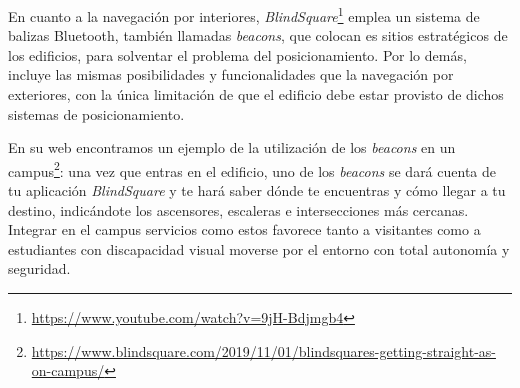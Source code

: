 En cuanto a la navegación por interiores, \textit{BlindSquare}\footnote{\url{https://www.youtube.com/watch?v=9jH-Bdjmgb4}} emplea un sistema de balizas Bluetooth, también llamadas \textit{beacons}, que colocan es sitios estratégicos de los edificios, para solventar el problema del posicionamiento. Por lo demás, incluye las mismas posibilidades y funcionalidades que la navegación por exteriores, con la única limitación de que el edificio debe estar provisto de dichos sistemas de posicionamiento.

En su web encontramos un ejemplo de la utilización de los \textit{beacons} en un campus\footnote{\url{https://www.blindsquare.com/2019/11/01/blindsquares-getting-straight-as-on-campus/}}: una vez que entras en el edificio, uno de los \textit{beacons} se dará cuenta de tu aplicación \textit{BlindSquare} y te hará saber dónde te encuentras y cómo llegar a tu destino, indicándote los ascensores, escaleras e intersecciones más cercanas. Integrar en el campus servicios como estos favorece tanto a visitantes como a estudiantes con discapacidad visual moverse por el entorno con total autonomía y seguridad.

